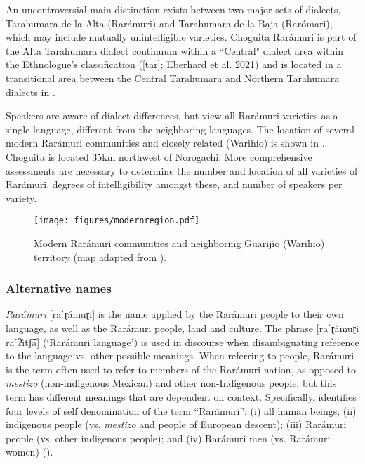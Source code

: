 An uncontroversial main distinction exists between two major sets of dialects, Tarahumara de la Alta (Rarámuri) and Tarahumara de la Baja (Rarómari), which may include mutually unintelligible varieties. Choguita Rarámuri is part of the Alta Tarahumara dialect continuum within a ``Central" dialect area within the Ethnologue’s classification ([tar]; Eberhard et al. 2021) and is located in a transitional area between the Central Tarahumara and Northern Tarahumara dialects in \citep{valinas2001lengua}.

Speakers are aware of dialect differences, but view all Rarámuri varieties as a single language, different from the neighboring languages. The location of several modern Rarámuri communities and closely related  (Warihío) is shown in . Choguita is located 35km northwest of Norogachi. More comprehensive assessments are necessary to determine the number and location of all varieties of Rarámuri, degrees of intelligibility amongst these, and number of speakers per variety.

\begin{figure}
\texttt{[image: figures/modernregion.pdf]}
\caption{
\label{fig: neighboring lgs}
Modern Rarámuri communities and neighboring  {Guarijío} ({Warihio}) territory (map adapted from \citealt[][232]{merrill2014ralamuli}).}
\end{figure}

\subsubsection{Alternative names}
\label{subsubsec: alternative names}

\textit{Rarámuri} [raˈɽámuɽi] is the name applied by the Rarámuri people to their own language, as well as the Rarámuri people, land and culture. The phrase [raˈɽámuɽi raˈʔìtʃ͡a] (`Rarámuri language') is used in discourse when disambiguating reference to the language vs. other possible meanings. When referring to people, Rarámuri is the term often used to refer to members of the Rarámuri nation, as opposed to \textit{mestizo} (non-indigenous Mexican) and other non-Indigenous people, but this term has different meanings that are dependent on context. Specifically, \citet{merrill2001identidad} identifies four levels of self denomination of the term ``Rarámuri'': (i) all human beings; (ii) indigenous people (vs. \textit{mestizo} and people of European descent); (iii) Rarámuri people (vs. other indigenous people); and (iv) Rarámuri men (vs. Rarámuri women) (\citeyear[88]{merrill2001identidad}).

